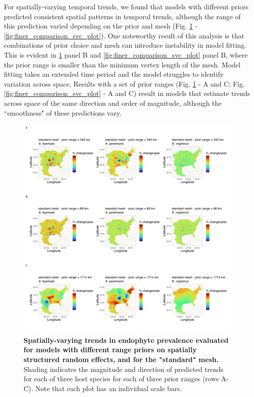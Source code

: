 \documentclass[11pt]{article}
\begin{document}
For spatially-varying temporal trends, we found that models with different priors predicted consistent spatial patterns in temporal trends, although the range of this prediction varied depending on the prior and mesh (Fig. \ref{fig:standard_comparison_svc_plot} - \ref{fig:finer_comparison_svc_plot}). One noteworthy result of this analysis is that combinations of prior choice and mesh can introduce instability in model fitting. This is evident in \ref{fig:standard_comparison_svc_plot} panel B and \ref{fig:finer_comparison_svc_plot} panel B, where the prior range is smaller than the minimum vertex length of the mesh.
Model fitting takes an extended time period and the model struggles to identify variation across space. Results with a set of prior ranges (Fig. \ref{fig:standard_comparison_svc_plot} -  A and C; Fig. \ref{fig:finer_comparison_svc_plot} - A and C) result in models that estimate trends across space of the same direction and order of magnitude, although the ``smoothness" of these predictions vary.

\begin{figure}[H]
	\centering
	\includegraphics[width = .8\linewidth]{../Plots/standard_mesh_comparison_svc_plot.png}
	\caption[Spatially-varying trends in endophyte prevalence evaluated for models with different range priors on spatially structured random effects, and for the "standard" mesh]{\textbf{Spatially-varying trends in endophyte prevalence evaluated for models with different range priors on spatially structured random effects, and for the "standard" mesh.} Shading indicates the magnitude and direction of predicted trends for each of three host species for each of three prior ranges (rows A-C). Note that each plot has an individual scale bars.}
	\label{fig:standard_comparison_svc_plot}
\end{figure}
\end{document}
